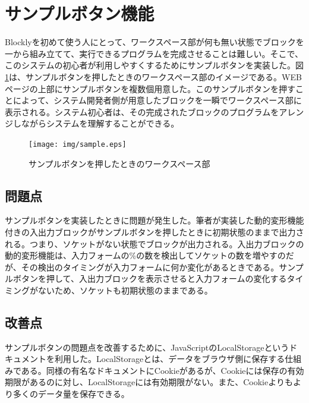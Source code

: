 \documentclass{eniepaper}
\begin{document}
\begin{itemize}
\end{itemize} 

   \section{サンプルボタン機能}
Blocklyを初めて使う人にとって、ワークスペース部が何も無い状態でブロックを一から組み立てて、実行できるプログラムを完成させることは難しい。そこで、このシステムの初心者が利用しやすくするためにサンプルボタンを実装した。図\ref{fig:sample}は、サンプルボタンを押したときのワークスペース部のイメージである。WEBページの上部にサンプルボタンを複数個用意した。このサンプルボタンを押すことによって、システム開発者側が用意したブロックを一瞬でワークスペース部に表示される。システム初心者は、その完成されたブロックのプログラムをアレンジしながらシステムを理解することができる。

\begin{figure}[h]
\begin{center}
\texttt{[image: img/sample.eps]}
\caption{サンプルボタンを押したときのワークスペース部}%
\label{fig:sample}
\end{center}%
\end{figure}%

   \subsection{問題点}
   
サンプルボタンを実装したときに問題が発生した。筆者が実装した動的変形機能付きの入出力ブロックがサンプルボタンを押したときに初期状態のままで出力される。つまり、ソケットがない状態でブロックが出力される。入出力ブロックの動的変形機能は、入力フォームの\%の数を検出してソケットの数を増やすのだが、その検出のタイミングが入力フォームに何か変化があるときである。サンプルボタンを押して、入出力ブロックを表示させると入力フォームの変化するタイミングがないため、ソケットも初期状態のままである。

   \subsection{改善点}
   
サンプルボタンの問題点を改善するために、JavaScriptのLocalStorage\cite{LocalStorage}というドキュメントを利用した。LocalStorageとは、データをブラウザ側に保存する仕組みである。同様の有名なドキュメントにCookieがあるが、Cookieには保存の有効期限があるのに対し、LocalStorageには有効期限がない。また、Cookieよりもより多くのデータ量を保存できる。
\end{document}
